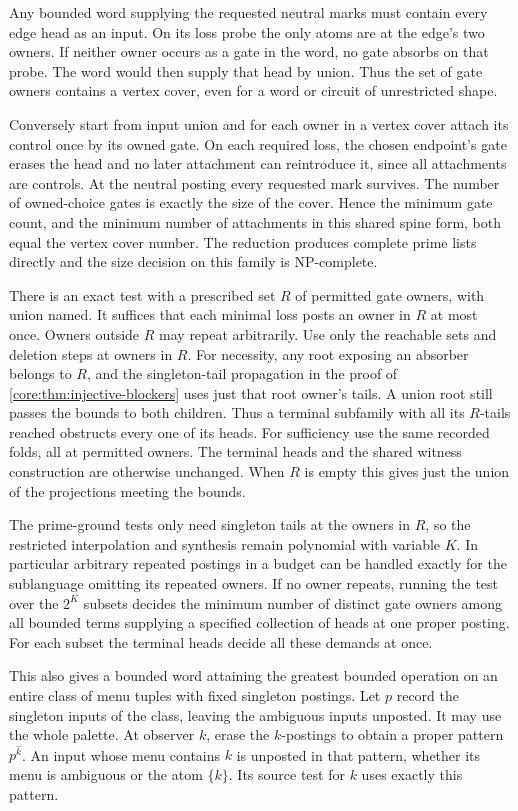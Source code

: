 Any bounded word supplying the requested neutral
marks must contain every edge head as an input.
On its loss probe the only atoms are at the edge's
two owners. If neither owner occurs as a gate in
the word, no gate absorbs on that probe. The word
would then supply that head by union. Thus the set
of gate owners contains a vertex cover, even for a
word or circuit of unrestricted shape.

Conversely start from input union and for each
owner in a vertex cover attach its control once by
its owned gate. On each required loss, the chosen
endpoint's gate erases the head and no later
attachment can reintroduce it, since all attachments
are controls. At the neutral posting every requested
mark survives. The number of owned-choice gates is
exactly the size of the cover. Hence the minimum
gate count, and the minimum number of attachments
in this shared spine form, both equal the vertex
cover number. The reduction produces complete
prime lists directly and the size decision on
this family is NP-complete.

There is an exact test with a prescribed set $R$ of
permitted gate owners, with union named. It suffices
that each minimal loss posts an owner in $R$ at most
once. Owners outside $R$ may repeat arbitrarily.
Use only the reachable sets and deletion steps at
owners in $R$. For necessity, any root exposing an
absorber belongs to $R$, and the singleton-tail
propagation in the proof of
\cref{core:thm:injective-blockers} uses just that root
owner's tails. A union root still passes the bounds
to both children. Thus a terminal subfamily with
all its $R$-tails reached obstructs every one of its
heads. For sufficiency use the same recorded folds,
all at permitted owners. The terminal heads and the
shared witness construction are otherwise unchanged.
When $R$ is empty this gives just the union of the
projections meeting the bounds.

The prime-ground tests only need singleton tails
at the owners in $R$, so the restricted interpolation
and synthesis remain polynomial with variable $K$.
In particular arbitrary repeated postings in a
budget can be handled exactly for the sublanguage
omitting its repeated owners. If no owner repeats,
running the test over the $2^K$ subsets decides the
minimum number of distinct gate owners among all
bounded terms supplying a specified collection of
heads at one proper posting. For each subset the
terminal heads decide all these demands at once.

This also gives a bounded word attaining the greatest
bounded operation on an entire class of menu tuples
with fixed singleton postings. Let $p$ record the
singleton inputs of the class, leaving the ambiguous
inputs unposted. It may use the whole palette. At
observer $k$, erase the $k$-postings to obtain a
proper pattern $p^{\widehat k}$. An input whose menu
contains $k$ is unposted in that pattern, whether
its menu is ambiguous or the atom $\{k\}$. Its
source test for $k$ uses exactly this pattern.

